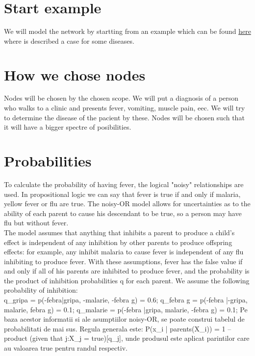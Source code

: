 \section{Start example}
\tab We will model the network by startting from an example which can be found \href{https://www.norsys.com/tutorials/netica/secA/tut_A1.html}{here} where is described a case for some diseases.\\

\section{How we chose nodes}
\tab Nodes will be chosen by the chosen scope. We will put a diagnosis of a person who walks to a clinic and presents fever, vomiting, muscle pain, eec. We will try to determine the disease of the pacient by these. Nodes 
will be chosen such that it will have a bigger spectre of posibilities.\\

\section{Probabilities}

\tab To calculate the probability of having fever, the logical "noisy" relationships are used. In propositional logic we can say that fever is true if and only if malaria, yellow fever or flu are true. The noisy-OR model allows for uncertainties as to the ability of each parent to cause his descendant to be true, so a person may have flu but without fever.\\
\tab The model assumes that anything that inhibits a parent to produce a child's effect is independent of any inhibition by other parents to produce offspring effects: for example, any inhibit malaria to cause fever is independent of any flu inhibiting to produce fever. With these assumptions, fever has the false value if and only if all of his parents are inhibited to produce fever, and the probability is the product of inhibition probabilities q for each parent. We assume the following probability of inhibition:\\
\begingroup\makeatletter\def\@currenvir{verbatim}
\verbatim
q_gripa = p(-febra|gripa, -malarie, -febra g) = 0.6;
q_febra g = p(-febra |-gripa, malarie, febra g) = 0.1;
q_malarie  = p(-febra |gripa, malarie, -febra g) = 0.1;
Pe baza acestor informatii si ale asumptiilor noisy-OR,
 se poate construi tabelul de probabilitati de mai sus. Regula generala este:
	P(x_i | parents(X_i)) = 1 – product (given that j:X_j = true)[q_j], 
unde produsul este aplicat parintilor care au valoarea true pentru randul respectiv.

